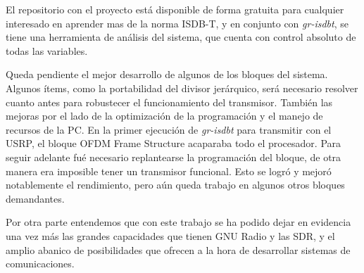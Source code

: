 \documentclass[journal,comsoc]{IEEEtran}
\begin{document}
El repositorio con el proyecto está disponible de forma gratuita para cualquier interesado en aprender mas de la norma ISDB-T, y en conjunto con \textit{gr-isdbt}, se tiene una herramienta de análisis del sistema, que cuenta con control absoluto de todas las variables. 

Queda pendiente el mejor desarrollo de algunos de los bloques del sistema. Algunos ítems, como la portabilidad del divisor jerárquico, será necesario resolver cuanto antes para robustecer el funcionamiento del transmisor. También las mejoras por el lado de la optimización de la programación y el manejo de recursos de la PC. En la primer ejecución de \textit{gr-isdbt} para transmitir con el USRP, el bloque OFDM Frame Structure acaparaba todo el procesador. Para seguir adelante fué necesario replantearse la programación del bloque, de otra manera era imposible tener un transmisor funcional. Esto se logró y mejoró notablemente el rendimiento, pero aún queda trabajo en algunos otros bloques demandantes.

Por otra parte entendemos que con este trabajo se ha podido dejar en evidencia una vez más las grandes capacidades que tienen GNU Radio y las SDR, y el amplio abanico de posibilidades que ofrecen a la hora de desarrollar sistemas de comunicaciones.





%
\end{document}
